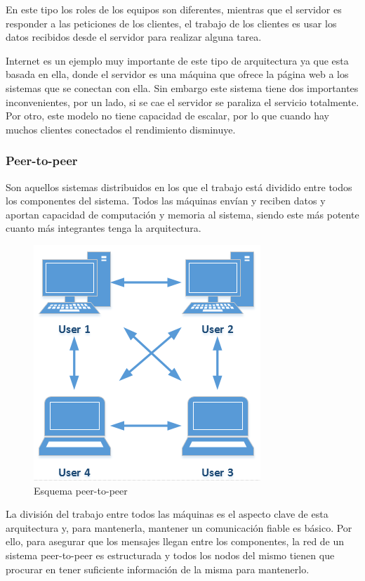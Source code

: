 En este tipo los roles de los equipos son diferentes, mientras que el servidor es responder a las peticiones de los clientes, el trabajo de los clientes es usar los datos recibidos desde el servidor para realizar alguna tarea.

Internet es un ejemplo muy importante de este tipo de arquitectura ya que esta basada en ella, donde el servidor es una máquina que ofrece la página web a los sistemas que se conectan con ella. Sin embargo este sistema tiene dos importantes inconvenientes, por un lado, si se cae el servidor se paraliza el servicio totalmente. Por otro, este modelo no tiene capacidad de escalar, por lo que cuando hay muchos clientes conectados el rendimiento disminuye.

\subsubsection{Peer-to-peer}
Son aquellos sistemas distribuidos en los que el trabajo está dividido entre todos los componentes del sistema. Todos las máquinas envían y reciben datos y aportan capacidad de computación y memoria al sistema, siendo este más potente cuanto más integrantes tenga la arquitectura.

\begin{figure}[htp!]
	\centering
	\caption{Esquema peer-to-peer \cite{peertopeer}}
	\label{peertopeer}
	\vspace{5pt}
	\includegraphics[scale=0.6]{graphics/peertopeer}
\end{figure}

La división del trabajo entre todos las máquinas es el aspecto clave de esta arquitectura y, para mantenerla, mantener un comunicación fiable es básico. Por ello, para asegurar que los mensajes llegan entre los componentes, la red de un sistema peer-to-peer es estructurada y todos los nodos del mismo tienen que procurar en tener suficiente información de la misma para mantenerlo.


